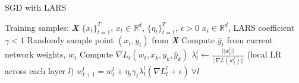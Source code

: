 \begin{minipage}[b]{.48\textwidth}
\begin{algorithm}[H]\small
	\caption{SGD with LARS \cite{ginsburg2018large}}
	\label{alg:lars}
	\begin{algorithmic}
	    \vspace{3pt}
		Training samples: \textbf{\textit{X}} \subset $\{x_t\}_{t=1}^T$, $x_t \in \mathbb{R}^d$, $\{\eta_t\}_{t=1}^T$, $\epsilon>0$
		$x_i \in \mathbb{R}^d$, LARS coefficient $\gamma <1$
		\vspace{4pt}
		\vspace{3pt}
		    \STATE Randomly sample point $(x_t,y_t)$ from \textbf{\textit{X}}
		    \vspace{3pt}
		    \STATE Compute $\hat y_t$ from current network weights, $w_t$
		    \vspace{3pt}
		    \STATE Compute $\nabla L_t(w_t, x_{k}, y_k,\hat y_k)$
		    \vspace{3pt}
        \STATE $\lambda_t^l \gets \frac{||w_t^l||}{||\nabla L(w_t^l)||}$ (local LR across each layer $l$)
        \vspace{3pt}
		    \STATE $w_{t+1}^{l} = w_{t}^{l} + \eta_t \gamma_t \lambda_t^l(\nabla L_{t}^{l} + \epsilon) \: \forall  l$
		\vspace{3pt}
		
		\ENDFOR
	\end{algorithmic}
\end{algorithm}
\end{minipage}\hfill%


